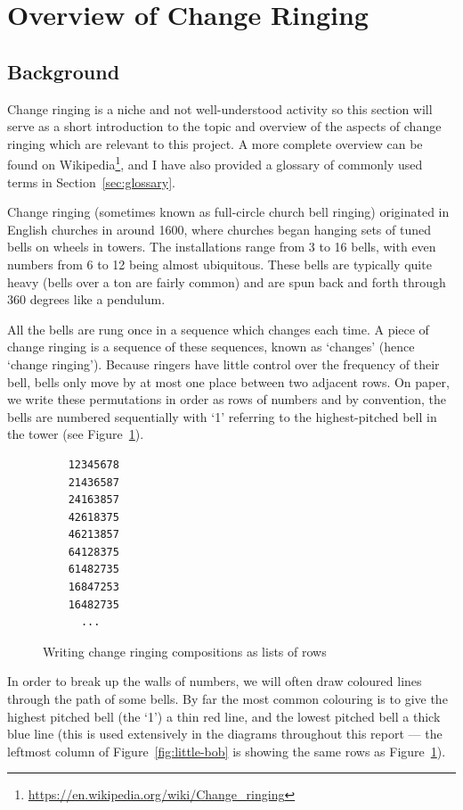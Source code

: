 \documentclass[12pt]{article}
\newcommand{\footurl}[1]{\footnote{\url{#1}}}
\begin{document}
\pagebreak

\section{Overview of Change Ringing}

\subsection{Background}

Change ringing is a niche and not well-understood activity so this section will serve as a short
introduction to the topic and overview of the aspects of change ringing which are relevant to this
project.  A more complete overview can be found on
Wikipedia\footurl{https://en.wikipedia.org/wiki/Change_ringing}, and I have also provided a glossary of
commonly used terms in Section~\ref{sec:glossary}.

Change ringing (sometimes known as full-circle church bell ringing) originated in English
churches in around 1600, where churches began hanging sets of tuned bells on wheels in towers.
The installations range from 3 to 16 bells, with even numbers from 6 to 12 being almost ubiquitous.
These bells are typically quite heavy (bells over a ton are fairly common) and are spun
back and forth through 360 degrees like a pendulum.

All the bells are rung once in a sequence which
changes each time.  A piece of change ringing is a sequence of these sequences, known as `changes'
(hence `change ringing').  Because ringers have little control over the frequency of their bell,
bells only move by at most one place between two adjacent rows.  On paper, we write these
permutations in order as rows of numbers and by convention, the bells are numbered sequentially with
`1' referring to the highest-pitched bell in the tower (see Figure~\ref{fig:rows}).

\begin{figure}
    \centering
    \begin{BVerbatim}
    12345678
    21436587
    24163857
    42618375
    46213857
    64128375
    61482735
    16847253
    16482735
      ...
    \end{BVerbatim}
    \caption{Writing change ringing compositions as lists of rows}\label{fig:rows}
\end{figure}

In order to break up the walls of numbers, we will often draw coloured lines through the path of
some bells.  By far the most common colouring is to give the highest pitched bell (the `1') a thin red line,
and the lowest pitched bell a thick blue line (this is used extensively in the diagrams throughout
this report --- the leftmost column of Figure~\ref{fig:little-bob} is showing the same rows as
Figure~\ref{fig:rows}).  
\end{document}
